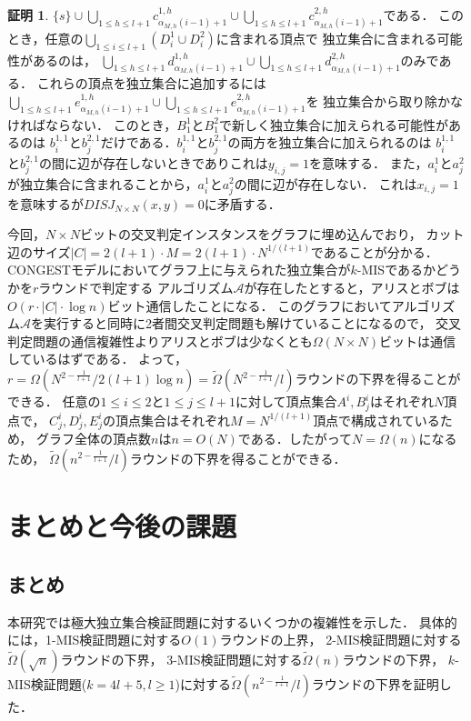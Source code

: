 \documentclass[12pt]{thesis}
\newcommand{\CONGEST}{\textsf{CONGEST}}
\theoremstyle{definition}
\newtheorem*{prf*}{証明}
\begin{document}
\begin{prf*}
$\{s\} \cup \bigcup_{1\leq h \leq l+1} c^{1,h}_{\alpha_{M,h}(i-1)+1} \cup 
\bigcup_{1\leq h \leq l+1} c^{2,h}_{\alpha_{M,h}(i-1)+1}$である．
このとき，任意の$\bigcup_{1 \leq i \leq l+1}(D^{1}_{i}\cup D^{2}_{i})$に含まれる頂点で
独立集合に含まれる可能性があるのは，
$\bigcup_{1\leq h \leq l+1} d^{1,h}_{\alpha_{M,h}(i-1)+1}\cup 
\bigcup_{1\leq h \leq l+1} d^{2,h}_{\alpha_{M,h}(i-1)+1}$のみである．
これらの頂点を独立集合に追加するには
$\bigcup_{1\leq h \leq l+1} e^{1,h}_{\alpha_{M,h}(i-1)+1}\cup 
\bigcup_{1\leq h \leq l+1} e^{2,h}_{\alpha_{M,h}(i-1)+1}$を
独立集合から取り除かなければならない．
このとき，$B^{1}_{1}$と$B^{2}_{1}$で新しく独立集合に加えられる可能性があるのは
$b^{1,1}_{i}$と$b^{2,1}_{j}$だけである．$b^{1,1}_{i}$と$b^{2,1}_{j}$の両方を独立集合に加えられるのは
$b^{1,1}_{i}$と$b^{2,1}_{j}$の間に辺が存在しないときでありこれは$y_{i,j}=1$を意味する．
また，$a^{1}_{i}$と$a^{2}_{j}$が独立集合に含まれることから，$a^{1}_{i}$と$a^{2}_{j}$の間に辺が存在しない．
これは$x_{i,j}=1$を意味するが$DISJ_{N\times N}(x,y)=0$に矛盾する．

今回，$N \times N$ビットの交叉判定インスタンスをグラフに埋め込んでおり，
カット辺のサイズ$|C| = 2(l + 1) \cdot M = 2(l + 1) \cdot N^{1/(l + 1)}$であることが分かる．
{\CONGEST}モデルにおいてグラフ上に与えられた独立集合が$k$-MISであるかどうかを$r$ラウンドで判定する
アルゴリズム$\mathcal{A}$が存在したとすると，アリスとボブは$O(r \cdot |C| \cdot \log n)$ビット通信したことになる．
このグラフにおいてアルゴリズム$\mathcal{A}$を実行すると同時に2者間交叉判定問題も解けていることになるので，
交叉判定問題の通信複雑性よりアリスとボブは少なくとも$\Omega (N \times N)$ビットは通信しているはずである．
よって，$r = \Omega \left(N^{2 - \frac{1}{l + 1}} / 2( l + 1)\log n\right) = \tilde{\Omega}\left(N^{2 - \frac{1}{l + 1}}/l\right)$ラウンドの下界を得ることができる．
任意の$1\leq i \leq 2$と$1\leq j \leq l+1$に対して頂点集合$A^{i}, B^{i}_{j}$はそれぞれ$N$頂点で，
$C^{i}_{j},D^{i}_{j},E^{i}_{j}$の頂点集合はそれぞれ$M=N^{1/(l + 1)}$頂点で構成されているため，
グラフ全体の頂点数$n$は$n = O(N)$である．したがって$N = \Omega(n)$になるため，
$\tilde{\Omega}\left(n^{2 - \frac{1}{l + 1}}/l\right)$ラウンドの下界を得ることができる．
\end{prf*}
\newpage

\chapter{まとめと今後の課題}
\section{まとめ}
本研究では極大独立集合検証問題に対するいくつかの複雑性を示した．
具体的には，1-MIS検証問題に対する$O(1)$ラウンドの上界，
2-MIS検証問題に対する$\tilde{\Omega} (\sqrt{n})$ラウンドの下界，
3-MIS検証問題に対する$\tilde{\Omega} (n)$ラウンドの下界，
$k$-MIS検証問題($k = 4l + 5, l \geq 1$)に対する$\tilde{\Omega}\left(n^{2 - \frac{1}{l + 1}}/l\right)$ラウンドの下界を証明した．
\end{document}
